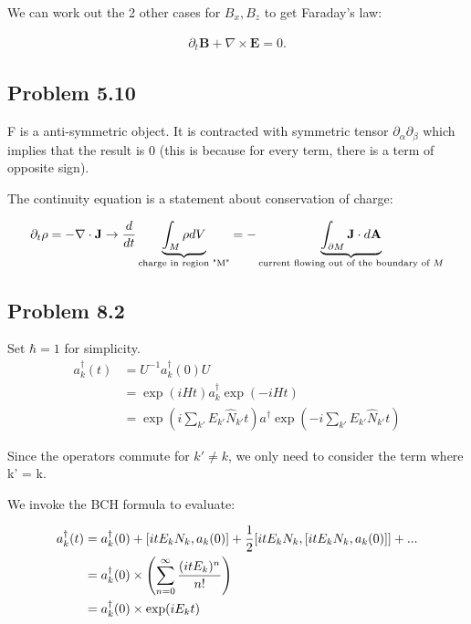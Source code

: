\documentclass[11pt]{article}
\theoremstyle{definition}
\begin{document}
We can work out the 2 other cases for $B_x, B_z$ to get Faraday's law:

\begin{align}
\partial_t \mathbf{B} + \nabla \times \mathbf{E} = 0.
\end{align}

\subsection{Problem 5.10}

F is a anti-symmetric object.  It is contracted with symmetric tensor $\partial_\alpha \partial_\beta$ which implies that the result is 0
(this is because for every term, there is a term of opposite sign).

The continuity equation is a statement about conservation of charge:

\begin{align}
\partial_t \rho = - \nabla \cdot \mathbf{J} \rightarrow {d  \over dt} \underbrace{\int_{M} \rho dV}_{\text{charge in region "M"}} = - \underbrace{\int_{\partial M} \mathbf{J} \cdot d \mathbf{A}}_{\text{current flowing out of the boundary of }M}
\end{align}

\subsection{Problem 8.2}
Set $\hbar = 1$ for simplicity.
\begin{align}
a_k^{\dagger}(t) &= U^{-1} a_k^{\dagger}(0) U \\
& = \exp(i H t) a_k^{\dagger} \exp(-i Ht)\\
& = \exp(i \sum_{k'} E_{k'}\hat{N}_{k'} t ) a^{\dagger}\exp(-i \sum_{k'} E_{k'} \hat{N}_{k'} t )
\end{align}

Since the operators commute for $k' \neq k$, we only need to consider the term where k' = k.

We invoke the BCH formula to evaluate:

\begin{align}
a^{\dagger}_k(t) &= a_k^{\dagger}(0) + [i t E_k N_k, a_k(0)] + \frac12  [i t E_k N_k, [i t E_k N_k, a_k(0)]] + ... \\
& = a_k^{\dagger}(0) \times \left(\sum_{n = 0}^{\infty} {(it E_k)^n \over n!} \right) \\
& = a_k^{\dagger}(0) \times \exp(i E_k t)
\end{align}
\end{document}

